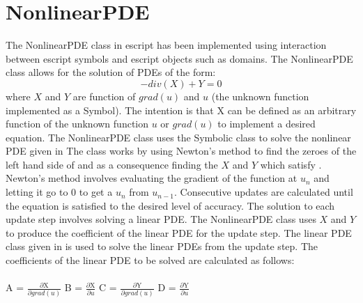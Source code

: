 \section{NonlinearPDE}
The NonlinearPDE class in escript has been implemented using interaction between escript symbols and escript objects such as domains. The NonlinearPDE class allows for the solution of PDEs of the form:
\begin{equation}
-div(X) + Y = 0
\label{symbolic eq1}
\end{equation}
where $X$ and $Y$ are function of $grad(u)$ and $u$ (the unknown function implemented as a Symbol).
The intention is that X can be defined as an arbitrary function of the unknown function $u$ or $grad(u)$ to implement a desired equation.
The NonlinearPDE class uses the Symbolic class to solve the nonlinear PDE given in 
The class works by using Newton's method to find the zeroes of the left hand side of  and as a consequence finding the
$X$ and $Y$ which satisfy . 
Newton's method involves evaluating the gradient of the function at $u_n$ and letting it go to 0 to get a $u_n$ from $u_{n-1}$. Consecutive updates are calculated until the equation is
satisfied to the desired level of accuracy. The solution to each update step involves solving a linear PDE. The NonlinearPDE class uses $X$ and $Y$ to produce the coefficient of the linear PDE for the update step. The linear PDE class given in  is used to solve the linear PDEs from the update step. The coefficients of the linear PDE to be solved are calculated as follows: \\\\
{
\centering 
 A = $\frac{\partial \text{X}}{\partial grad(u)}$   B = $\frac{\partial \text{X}}{\partial u}$   C = $\frac{\partial \text{Y}}{\partial grad(u)}$    D = $\frac{\partial \text{Y}}{\partial u}$
}
